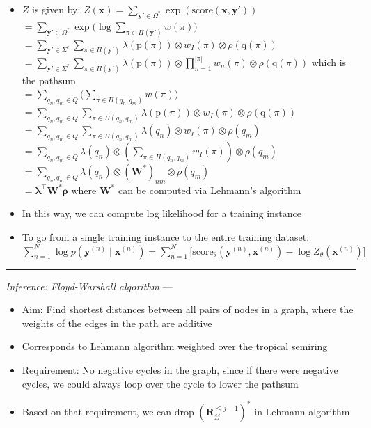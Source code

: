 \begin{itemize}
    \item $Z$ is given by:
    $
    Z(\boldsymbol{x}) = \sum_{\boldsymbol{y}' \in \Omega^*} \exp(\textrm{score}(\boldsymbol{x}, \boldsymbol{y}'))
    $\\
    $
    = \sum_{\boldsymbol{y}' \in \Omega^*} \exp \Big( \log \sum_{\pi \in \Pi(\boldsymbol{y}')} w(\pi) \Big)
    $\\
    $
    = \sum_{\boldsymbol{y}' \in \Sigma^*} \sum_{\pi \in \Pi(\boldsymbol{y}')} \lambda(\textrm{p}(\pi)) \otimes w_I(\pi) \otimes \rho(\textrm{q}(\pi))
    $\\
    $
    = \sum_{\boldsymbol{y}' \in \Sigma^*} \sum_{\pi \in \Pi(\boldsymbol{y}')} \lambda(\textrm{p}(\pi)) \otimes \prod_{n=1}^{| \pi |} w_n(\pi) \otimes \rho(\textrm{q}(\pi))
    $ which is the pathsum\\
    $
    = \sum_{q_n, q_m \in Q} \Big( \sum_{\pi \in \Pi(q_n, q_m)} w(\pi) \Big)
    $\\
    $
    = \sum_{q_n, q_m \in Q} \sum_{\pi \in \Pi(q_n, q_m)} \lambda(\textrm{p}(\pi)) \otimes w_I(\pi) \otimes \rho(\textrm{q}(\pi))
    $\\
    $
    = \sum_{q_n, q_m \in Q} \sum_{\pi \in \Pi(q_n, q_m)} \lambda(q_n) \otimes w_I(\pi) \otimes \rho(q_m)
    $\\
    $
    = \sum_{q_n, q_m \in Q} \lambda(q_n) \otimes (\sum_{\pi \in \Pi(q_n, q_m)} w_I(\pi)) \otimes \rho(q_m)
    $\\
    $
    = \sum_{q_n, q_m \in Q} \lambda(q_n) \otimes (\boldsymbol{W}^*)_{nm} \otimes \rho(q_m)
    $\\
    $
    = \boldsymbol{\lambda}^\intercal \boldsymbol{W}^* \boldsymbol{\rho}
    $ where $\boldsymbol{W}^*$ can be computed via Lehmann's algorithm
    \item In this way, we can compute log likelihood for a training instance 
    \item To go from a single training instance to the entire training dataset: $\sum_{n=1}^N \log p(\boldsymbol{y}^{(n)} \mid \boldsymbol{x}^{(n)}) = \sum_{n=1}^N \Big[ \textrm{score}_\theta(\boldsymbol{y}^{(n)}, \boldsymbol{x}^{(n)}) - \log Z_\theta(\boldsymbol{x}^{(n)}) \Big]$
\end{itemize}

{\color{lightgray}\hrule height 0.001mm}

\emph{Inference: Floyd-Warshall algorithm} ---
\begin{itemize}
    \item Aim: Find shortest distances between all pairs of nodes in a graph, where the weights of the edges in the path are additive
    \item Corresponds to Lehmann algorithm weighted over the tropical semiring
    \item Requirement: No negative cycles in the graph, since if there were negative cycles, we could always loop over the cycle to lower the pathsum
    \item Based on that requirement, we can drop $(\boldsymbol{R}_{jj}^{\leq j-1 })^*$ in Lehmann algorithm
\end{itemize}


